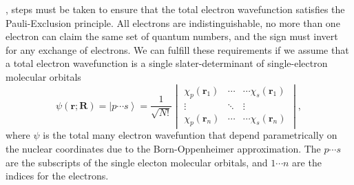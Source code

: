 , steps must be taken to ensure that the total electron wavefunction satisfies the Pauli-Exclusion principle.
All electrons are indistinguishable, no more than one electron can claim the same set of quantum numbers, and the sign must invert for any exchange of electrons.
We can fulfill these requirements if we assume that a total electron wavefunction is a single slater-determinant of single-electron molecular orbitals
\begin{equation} \label{eq:slater-determinant} \psi(\bm{r};\bm{R}) =
  \left|p \cdots s\right> = \frac{1}{\sqrt{N!}}
  \begin{vmatrix}
    \chi_{p}(\bm{r}_1) & \cdots & \cdots \chi_{s}(\bm{r}_1) \\
    \vdots             & \ddots         &       \vdots      \\
    \chi_{p}(\bm{r}_n) & \cdots & \cdots \chi_{s}(\bm{r}_n)
  \end{vmatrix},
\end{equation}
where \(\psi\) is the total many electron wavefuntion that depend parametrically on the nuclear coordinates due to the Born-Oppenheimer approximation.
The $p \cdots s$ are the subscripts of the single electon molecular orbitals, and $1 \cdots n$ are the indices for the electrons.

